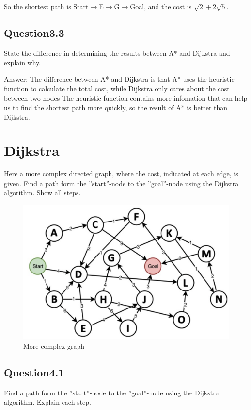 \documentclass{article}
\begin{document}
        So the shortest path is Start$\rightarrow$E$\rightarrow$G$\rightarrow$Goal, and the cost is $\sqrt{2}+2\sqrt{5}$.
        \subsection{Question3.3}
        State the difference in determining the results between A* and Dijkstra and explain why.

        \noindent
        Answer: The difference between A* and Dijkstra is that A* uses the heuristic function to calculate the total cost, while Dijkstra only cares about the cost between two nodes
        The heuristic function contains more infomation that can help us to find the shortest path more quickly, so the result of A* is better than Dijkstra.
    \newpage
    
    \section{Dijkstra}
    Here a more complex directed graph, where the cost, indicated at each edge, is given. Find a path form the ”start”-node to the ”goal”-node using the Dijkstra algorithm. Show all steps.
    \begin{figure}[H]
        \centering
        \includegraphics[width=1\linewidth]{img4.jpeg}
        \caption{More complex graph}
        \label{4}
    \end{figure}
        \subsection{Question4.1}
        Find a path form the ”start”-node to the ”goal”-node using the Dijkstra algorithm. Explain each step.
\end{document}
